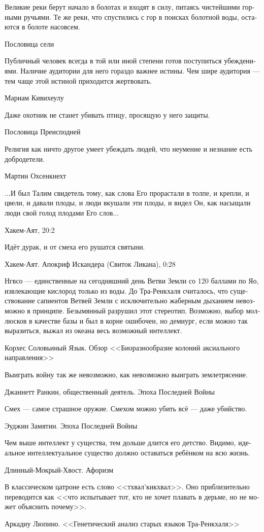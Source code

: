 \documentclass[a4paper,12pt,fleqn]{book}\usepackage{polyglossia}\setdefaultlanguage[babelshorthands=true]{russian}\setotherlanguage{english}\defaultfontfeatures{Ligatures=TeX,Mapping=tex-text}\usepackage{xcolor}\newcommand{\ml}[3]{#2}
\begin{document}
{\epigraph
{Великие реки берут начало в болотах и входят в силу, питаясь чистейшими горными ручьями.
Те же реки, что спустились с гор в поисках болотной воды, остаются в болоте насовсем.}
{Пословица сели}

\epigraph
{Публичный человек всегда в той или иной степени готов поступиться убеждениями.
Наличие аудитории для него гораздо важнее истины.
Чем шире аудитория --- тем чаще этой истиной приходится жертвовать.}
{Мариам Кивихеулу}

\epigraph
{Даже охотник не станет убивать птицу, просящую у него защиты.}
{Пословица Преисподней}

\epigraph{
\ml{$0$}
{Религия как ничто другое умеет убеждать людей, что неумение и незнание есть добродетели.}
{Religion like nothing else can convince people that there's a virtue in ignorance and inexperience.}
}{
Мартин Охсенкнехт
}

\epigraph
{...И был Талим свидетель тому, как слова Его прорастали в толпе, и крепли, и цвели, и давали плоды, и люди вкушали эти плоды, и видел Он, как насыщали люди свой голод плодами Его слов...}
{Хакем-Аят, 20:2}

\epigraph
{Идёт дурак, и от смеха его рушатся святыни.}
{Хакем-Аят. Апокриф Искандера (Свиток Ликана), 0:28}

\epigraph
{Нгвсо --- единственные на сегодняшний день Ветви Земли со 120 баллами по Яо, извлекающие кислород только из воды.
До Тра-Ренкхаля считалось, что существование сапиентов Ветвей Земли с исключительно жаберным дыханием невозможно в принципе.
Безымянный разрушил этот стереотип.
Возможно, выбор моллюсков в качестве базы и был в корне ошибочен, но демиург, если можно так выразиться, выжал из океана весь возможный интеллект.}
{Корхес Соловьиный Язык.
Обзор <<Биоразнообразие колоний аксиального направления>>}

\epigraph
{Выиграть войну так же невозможно, как невозможно выиграть землетрясение.}
{Джаннетт Ранкин, общественный деятель.
Эпоха Последней Войны}

\epigraph
{Смех --- самое страшное оружие.
Смехом можно убить всё --- даже убийство.}
{Эуджин Замятин.
Эпоха Последней Войны}

\epigraph
{Чем выше интеллект у существа, тем дольше длится его детство.
Видимо, идеальное интеллектуальное существо должно оставаться ребёнком на всю жизнь.}
{Длинный-Мокрый-Хвост.
Афоризм}

\epigraph{
\ml{$0$}
{В классическом цатроне есть слово <<тхвал'кикхвал>>.}
{There is a word ``tchu\={a}l'k\'{\i}kchu\r{a}l'' in Classical Te's\'{a}tr\v{o}n.}
\ml{$0$}
{Оно приблизительно переводится как <<что испытывает тот, кто не хочет плавать в дерьме, но не может объяснить почему>>.}
{It can roughly be translated as ``how it feels when you don't want to swim in shit and can't explain why''.}
}{
Аркадиу Люпино.
<<Генетический анализ старых языков Тра-Ренкхаля>>
}

}
\end{document}
